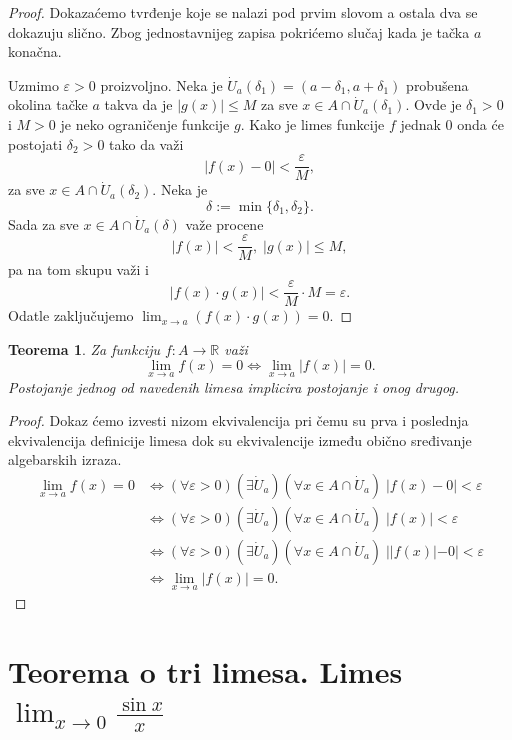 \documentclass[a4paper,12pt]{article}
\theoremstyle{plain}
\newtheorem{theorem}{Teorema}[section]
\theoremstyle{definition}
\theoremstyle{remark}
\begin{document}
\begin{proof}
    Dokazaćemo tvrđenje koje se nalazi pod prvim slovom a ostala dva se dokazuju slično. Zbog jednostavnijeg zapisa pokrićemo slučaj kada je tačka $a$ konačna.
    
    Uzmimo $\varepsilon > 0$ proizvoljno. Neka je $\dot{U}_a(\delta_1) = (a - \delta_1, a + \delta_1)$ probušena okolina tačke $a$ takva da je $|g(x)| \le M$ za sve $x \in A \cap \dot{U}_a(\delta_1)$. Ovde je $\delta_1 > 0$ i $M > 0$ je neko ograničenje funkcije $g$. Kako je limes funkcije $f$ jednak $0$ onda će postojati $\delta_2 > 0$ tako da važi
    \[ |f(x) - 0| < \frac{\varepsilon}{M}, \]
    za sve $x \in A \cap \dot{U}_a(\delta_2)$. Neka je
    \[ \delta := \min\{\delta_1, \delta_2\}. \]
    Sada za sve $x \in A \cap \dot{U}_a(\delta)$ važe procene
    \[ |f(x)| < \frac{\varepsilon}{M}, \; |g(x)| \le M, \]
    pa na tom skupu važi i
    \[ |f(x) \cdot g(x)| < \frac{\varepsilon}{M} \cdot M = \varepsilon. \]
    Odatle zaključujemo $\displaystyle \lim_{x \to a} (f(x) \cdot g(x)) = 0$.
\end{proof}
\begin{theorem}
    \label{16-7}
    Za funkciju $f : A \to \mathbb{R}$ važi
    \[ \lim_{x \to a} f(x) = 0 \iff \lim_{x \to a} |f(x)| = 0. \]
    Postojanje jednog od navedenih limesa implicira postojanje i onog drugog.
\end{theorem}

\begin{proof}
    Dokaz ćemo izvesti nizom ekvivalencija pri čemu su prva i poslednja ekvivalencija definicije limesa dok su ekvivalencije između obično sređivanje algebarskih izraza.
    \begin{align*}
        \lim_{x \to a} f(x) = 0 &\iff (\forall \varepsilon > 0)(\exists \dot{U}_a)(\forall x \in A \cap \dot{U}_a) \; |f(x) - 0| < \varepsilon \\
        &\iff (\forall \varepsilon > 0)(\exists \dot{U}_a)(\forall x \in A \cap \dot{U}_a) \; |f(x)| < \varepsilon \\
        &\iff (\forall \varepsilon > 0)(\exists \dot{U}_a)(\forall x \in A \cap \dot{U}_a) \; ||f(x)| - 0| < \varepsilon \\
        &\iff \lim_{x \to a} |f(x)| = 0.
    \end{align*}
\end{proof}

\section{Teorema o tri limesa. Limes \texorpdfstring{$\displaystyle\lim_{x\to0} \frac{\sin x}{x}$}{lim sin x / x}}
\end{document}
